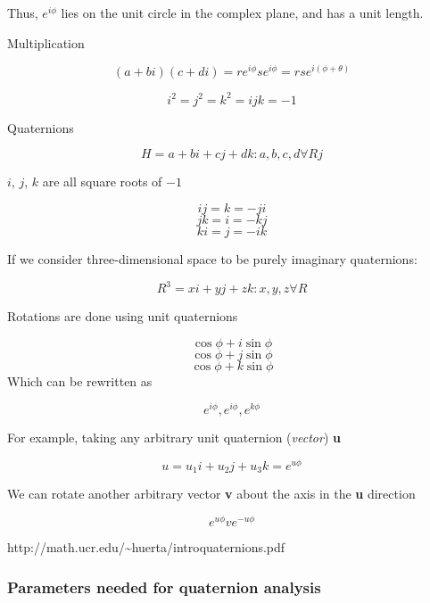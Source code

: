 \documentclass[]{article}
\begin{document}
Thus, \(e^{i\phi}\) lies on the unit circle in the complex plane, and
has a unit length.

Multiplication

\[
(a+bi)(c+di) = re^{i\phi}se^{i\phi} = rse^{i(\phi + \theta)}
\]

\[
i^2 = j^2 = k^2 = ijk = -1
\]

Quaternions

\[
H = { a + bi + cj + dk : a,b,c,d \forall R }j
\]

\(i\), \(j\), \(k\) are all square roots of \(-1\)

\[
ij = k = -ji 
\] \[
jk = i = -kj 
\] \[
ki = j = -ik
\]

If we consider three-dimensional space to be purely imaginary
quaternions:

\[
R^3 = {xi + yj + zk : x,y,z \forall R}
\]

Rotations are done using unit quaternions

\[
\cos \phi + i \sin \phi 
\] \[
\cos \phi + j \sin \phi 
\] \[
\cos \phi + k \sin \phi
\] Which can be rewritten as

\[
e^{i\phi}, e^{i\phi}, e^{k\phi}
\]

For example, taking any arbitrary unit quaternion (\emph{vector})
\textbf{u}

\[
u = u_1i + u_2j + u_3k = e^{u\phi}
\]

We can rotate another arbitrary vector \textbf{v} about the axis in the
\textbf{u} direction

\[
e^{u\phi}ve^{-u\phi}
\]

http://math.ucr.edu/\textasciitilde{}huerta/introquaternions.pdf

\subsubsection{Parameters needed for quaternion
analysis}\label{parameters-needed-for-quaternion-analysis}
\end{document}
